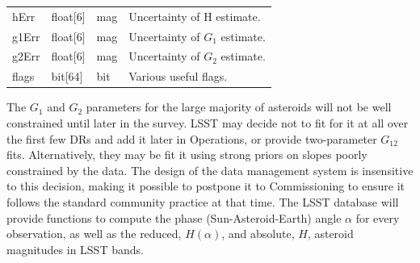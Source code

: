 \begin{center}
\begin{longtable}{p{3cm}p{2cm}p{2cm}p{5cm}}
hErr & float[6] & mag & Uncertainty of H estimate.\\

g1Err & float[6] & mag & Uncertainty of $G_1$ estimate. \\

g2Err & float[6] & mag & Uncertainty of $G_2$ estimate. \\

flags & bit[64] & bit & Various useful flags. \\ \hline

\end{longtable}
\end{center}

The $G_1$ and $G_2$ parameters for the large majority of asteroids will not be well constrained until later in the survey. LSST may decide not to fit for it at all over the first few DRs and add it later in Operations, or provide two-parameter $G_{12}$ fits. Alternatively, they may be fit it using strong priors on slopes poorly constrained by the data. The design of the data management system is insensitive to this decision, making it possible to postpone it to Commissioning to ensure it follows the standard community practice at that time. 
The LSST database will provide functions to compute the phase (Sun-Asteroid-Earth) angle $\alpha$ for every observation, as well as the reduced, $H(\alpha)$, and absolute, $H$, asteroid magnitudes in LSST bands.






